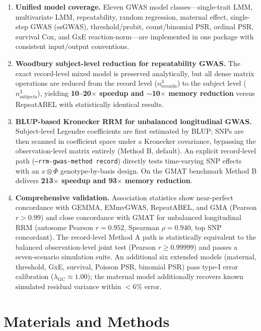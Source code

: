 \documentclass[11pt,a4paper]{article}
\begin{document}
\begin{enumerate}
\item \textbf{Unified model coverage.} Eleven GWAS model classes---single-trait LMM, multivariate LMM, repeatability, random regression, maternal effect, single-step GWAS (ssGWAS), threshold/probit, count/binomial PSR, ordinal PSR, survival Cox, and GxE reaction-norm---are implemented in one package with consistent input/output conventions.
\item \textbf{Woodbury subject-level reduction for repeatability GWAS.} The exact record-level mixed model is preserved analytically, but all dense matrix operations are reduced from the record level ($n_{\text{records}}^3$) to the subject level ($n_{\text{subjects}}^3$), yielding \textbf{10--20$\times$ speedup and $\sim$10$\times$ memory reduction} versus RepeatABEL with statistically identical results.
\item \textbf{BLUP-based Kronecker RRM for unbalanced longitudinal GWAS.} Subject-level Legendre coefficients are first estimated by BLUP; SNPs are then scanned in coefficient space under a Kronecker covariance, bypassing the observation-level matrix entirely (Method B, default). An explicit record-level path (\texttt{--rrm-gwas-method record}) directly tests time-varying SNP effects with an $x \otimes \Phi$ genotype-by-basis design. On the GMAT benchmark Method B delivers \textbf{213$\times$ speedup and 93$\times$ memory reduction}.
\item \textbf{Comprehensive validation.} Association statistics show near-perfect concordance with GEMMA, EMmvGWAS, RepeatABEL, and GMA (Pearson $r > 0.99$) and close concordance with GMAT for unbalanced longitudinal RRM (autosome Pearson $r = 0.952$, Spearman $\rho = 0.940$, top SNP concordant). The record-level Method A path is statistically equivalent to the balanced observation-level joint test (Pearson $r \geq 0.99999$) and passes a seven-scenario simulation suite. An additional six extended models (maternal, threshold, GxE, survival, Poisson PSR, binomial PSR) pass type-I error calibration ($\lambda_{\text{GC}} \approx 1.00$); the maternal model additionally recovers known simulated residual variance within $<6\%$ error.
\end{enumerate}

\newpage
\section{Materials and Methods}
\label{sec:methods}
\end{document}
